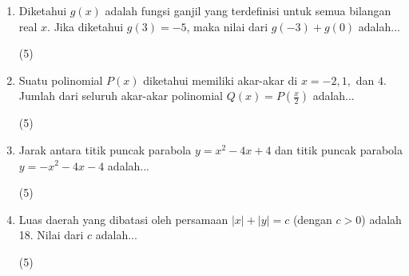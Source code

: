 \documentclass[12pt]{scrartcl}
\begin{document}
\begin{enumerate}
\item Diketahui $g(x)$ adalah fungsi ganjil yang terdefinisi untuk semua bilangan real $x$. Jika diketahui $g(3) = -5$, maka nilai dari $g(-3) + g(0)$ adalah...

\begin{tasks}[label=\Alph*](5)     

\end{tasks}

\item Suatu polinomial $P(x)$ diketahui memiliki akar-akar di $x = -2, 1,$ dan $4$. Jumlah dari seluruh akar-akar polinomial $Q(x) = P\left(\frac{x}{2}\right)$ adalah...

\begin{tasks}[label=\Alph*](5)     

\end{tasks}

\item Jarak antara titik puncak parabola $y = x^2 - 4x + 4$ dan titik puncak parabola $y = -x^2 - 4x - 4$ adalah...

\begin{tasks}[label=\Alph*](5)     

\end{tasks}

\item Luas daerah yang dibatasi oleh persamaan $|x| + |y| = c$ (dengan $c > 0$) adalah 18. Nilai dari $c$ adalah...

\begin{tasks}[label=\Alph*](5)     

\end{tasks}
\end{enumerate}
\end{document}
